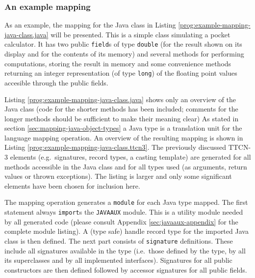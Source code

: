 \subsubsection{An example mapping}

As an example, the mapping for the Java class in Listing
\ref{prog:example-mapping-java-class.java} will be presented.
This is a simple class simulating a pocket calculator.
It has two public \verb=field=s of type \verb=double=
(for the result shown on its display and for the contents of its memory)
and several methods for performing computations,
storing the result in memory
and some convenience methods returning an integer representation
(of type \verb=long=)
of the floating point values accesible through the public fields.

\begin{program}
\caption{A Java class to be mapped%
	\label{prog:example-mapping-java-class.java}}
\end{program}

Listing \ref{prog:example-mapping-java-class.java}
shows only an overview of the Java class
(code for the shorter methods has been included;
comments for the longer methods
should be sufficient to make their meaning clear)
As stated in section \ref{sec:mapping-java-object-types}
a Java type is a translation unit for the language mapping operation.
An overview of the resulting mapping is shown in
Listing \ref{prog:example-mapping-java-class.ttcn3}.
The previously discussed \ac{TTCN-3} elements
(e.g.\ signatures, record types, a casting template)
are generated for all methods accessible in the Java class
and for all types used (as arguments, return values or thrown exceptions).
The listing is larger and
only some significant elements have been chosen for inclusion here.

\begin{program}
\scriptsize
{}
\caption{The resulted mapping%
	\label{prog:example-mapping-java-class.ttcn3}}
\end{program}

The mapping operation generates a \verb=module= for each Java type mapped.
The first statement always \verb=import=s the \verb=JAVAAUX= module.
This is a utility module needed by all generated code
(please consult Appendix \ref{sec:javaaux-appendix}
for the complete module listing).
A (type safe) handle record type for the imported Java class is then defined.
The next part consists of \verb=signature= definitions.
These include all signatures available in the type
(i.e.\ those defined by the type,
by all its superclasses and by all implemented interfaces).
Signatures for all public constructors are then defined
followed by accessor signatures for all public fields.

